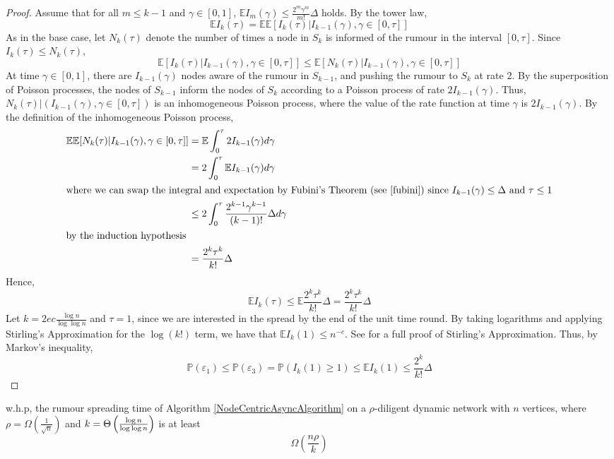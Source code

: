 \begin{proof}
	Assume that for all $m \leq k - 1$ and $\gamma \in [0,1]$, $\mathbb{E}I_m(\gamma) \leq \frac{2^m \gamma^m}{m!}\Delta$ holds.
	By the tower law,
	$$
		\mathbb{E}I_k(\tau) = \mathbb{E}\mathbb{E}[I_k(\tau) |I_{k-1}(\gamma), \gamma \in [0, \tau]]
	$$
	As in the base case, let $N_k(\tau)$ denote the number of times a node in $S_k$ is informed of the rumour in the interval $[0, \tau]$. Since $I_k(\tau) \leq N_k(\tau)$,
	$$
		\mathbb{E}[I_k(\tau) |I_{k-1}(\gamma), \gamma \in [0, \tau]] \leq \mathbb{E}[N_k(\tau) |I_{k-1}(\gamma), \gamma \in [0, \tau]]
	$$
	At time $\gamma \in [0,1]$, there are $I_{k-1}(\gamma)$ nodes aware of the rumour in $S_{k-1}$, and pushing the rumour to $S_k$ at rate 2. By the superposition of Poisson processes, the nodes of $S_{k-1}$ inform the nodes of $S_k$ according to a Poisson process of rate $2 I_{k-1}(\gamma)$.
	Thus, $N_k(\tau)|(I_{k-1}(\gamma), \gamma \in [0, \tau])$ is an inhomogeneous Poisson process, where the value of the rate function at time $\gamma$ is $2 I_{k-1}(\gamma)$. By the definition of the inhomogeneous Poisson process,
	\begin{align*}
		\mathbb{E}\mathbb{E}[N_k(\tau)|I_{k-1}(\gamma), \gamma \in [0, \tau]] &= \mathbb{E}\int_0^\tau 2 I_{k-1}(\gamma) d\gamma \\
		&= 2 \int_0^\tau \mathbb{E}I_{k-1}(\gamma) d\gamma \\ 
		\intertext{where we can swap the integral and expectation by Fubini's Theorem (see \cite{fubini}) since $I_{k-1}(\gamma) \leq \Delta$ and $\tau \leq 1$}
		& \leq 2 \int_0^\tau \frac{2^{k-1} \gamma^{k-1}}{(k-1)!} \Delta d\gamma \\
		\intertext{by the induction hypothesis}
		& = \frac{2^k \tau^k}{k!} \Delta
	\end{align*}
	Hence,
	$$
		\mathbb{E}I_k(\tau) \leq \mathbb{E}\frac{2^k \tau^k}{k!}\Delta = \frac{2^k \tau^k}{k!}\Delta
	$$
	Let $k=2ec\frac{\log n}{\log \log n}$ and $\tau = 1$, since we are interested in the spread by the end of the unit time round. By taking logarithms and applying Stirling's Approximation for the $\log (k!)$ term, we have that $\mathbb{E}I_k(1) \leq n^{-c}$.
	See \cite{stirling} for a full proof of Stirling's Approximation. 
	Thus, by Markov's inequality,
	$$
		\mathbb{P}(\varepsilon_1) \leq \mathbb{P}(\varepsilon_3) = \mathbb{P}(I_k(1) \geq 1) \leq \mathbb{E}I_k(1) \leq \frac{2^k}{k!}\Delta
	$$
\end{proof}

\begin{theorem}
	w.h.p, the rumour spreading time of Algorithm \ref{NodeCentricAsyncAlgorithm} on a $\rho$-diligent dynamic network with $n$ vertices, where $\rho = \Omega(\frac{1}{\sqrt{n}})$ and $k = \Theta\left(\frac{\log n}{\log \log n}\right)$ is at least 
	$$
		\Omega\left(\frac{n \rho}{k}\right)
	$$
\end{theorem}

